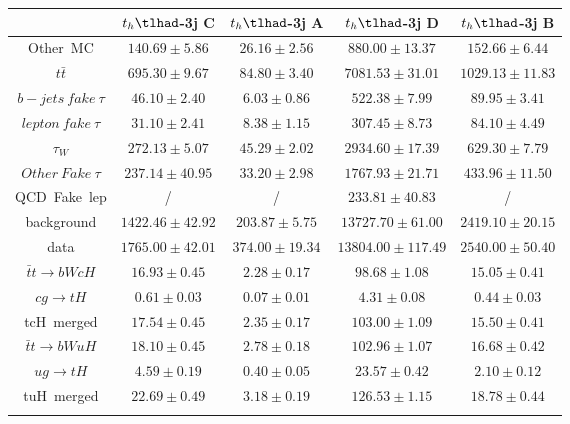 \begin{tabular}{ccccc} \toprule\toprule
 & $t_{h}\tlhad$-3j C & $t_{h}\tlhad$-3j A & $t_{h}\tlhad$-3j D & $t_{h}\tlhad$-3j B\\\midrule
Other~MC & $140.69\pm5.86$ & $26.16\pm2.56$ & $880.00\pm13.37$ & $152.66\pm6.44$\\
$t\bar{t}$ & $695.30\pm9.67$ & $84.80\pm3.40$ & $7081.53\pm31.01$ & $1029.13\pm11.83$\\
$b-jets~fake~\tau$ & $46.10\pm2.40$ & $6.03\pm0.86$ & $522.38\pm7.99$ & $89.95\pm3.41$\\
$lepton~fake~\tau$ & $31.10\pm2.41$ & $8.38\pm1.15$ & $307.45\pm8.73$ & $84.10\pm4.49$\\
$\tau_{W}$ & $272.13\pm5.07$ & $45.29\pm2.02$ & $2934.60\pm17.39$ & $629.30\pm7.79$\\
$Other~Fake~\tau$ & $237.14\pm40.95$ & $33.20\pm2.98$ & $1767.93\pm21.71$ & $433.96\pm11.50$\\
QCD~Fake~lep &  / &  / & $233.81\pm40.83$ &  /\\
background & $1422.46\pm42.92$ & $203.87\pm5.75$ & $13727.70\pm61.00$ & $2419.10\pm20.15$\\
data & $1765.00\pm42.01$ & $374.00\pm19.34$ & $13804.00\pm117.49$ & $2540.00\pm50.40$\\
$\bar{t}t\to bWcH$ & $16.93\pm0.45$ & $2.28\pm0.17$ & $98.68\pm1.08$ & $15.05\pm0.41$\\
$cg\to tH$ & $0.61\pm0.03$ & $0.07\pm0.01$ & $4.31\pm0.08$ & $0.44\pm0.03$\\
tcH~merged & $17.54\pm0.45$ & $2.35\pm0.17$ & $103.00\pm1.09$ & $15.50\pm0.41$\\
$\bar{t}t\to bWuH$ & $18.10\pm0.45$ & $2.78\pm0.18$ & $102.96\pm1.07$ & $16.68\pm0.42$\\
$ug\to tH$ & $4.59\pm0.19$ & $0.40\pm0.05$ & $23.57\pm0.42$ & $2.10\pm0.12$\\
tuH~merged & $22.69\pm0.49$ & $3.18\pm0.19$ & $126.53\pm1.15$ & $18.78\pm0.44$\\
\bottomrule\bottomrule\\
\end{tabular}
